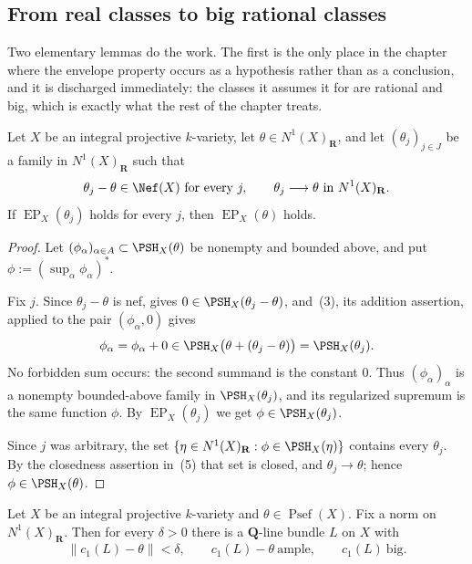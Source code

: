 \subsection{From real classes to big rational classes}
\label{sec:ch40-real-to-rational}

Two elementary lemmas do the work.  The first is the only place in the
chapter where the envelope property occurs as a hypothesis rather than as a
conclusion, and it is discharged immediately: the classes it assumes it for
are rational and big, which is exactly what the rest of the chapter treats.

\begin{lemma}
\label{lem:ch40-ep-nef-limit}
Let $X$ be an integral projective $k$-variety, let
$\theta\in N^1(X)_{\mathbf R}$, and let $(\theta_j)_{j\in J}$ be a family
in $N^1(X)_{\mathbf R}$ such that
\[
 \theta_j-\theta\in\Nef(X)\ \text{for every }j,
 \qquad
 \theta_j\longrightarrow\theta\ \text{in }N^1(X)_{\mathbf R}.
\]
If $\operatorname{EP}_X(\theta_j)$ holds for every $j$, then
$\operatorname{EP}_X(\theta)$ holds.
\end{lemma}

\begin{proof}
Let $(\phi_\alpha)_{\alpha\in A}\subset\PSH_X(\theta)$ be nonempty and
bounded above, and put $\phi:=(\sup_\alpha\phi_\alpha)^*$.

Fix $j$.  Since $\theta_j-\theta$ is nef,
 gives $0\in\PSH_X(\theta_j-\theta)$, and
\,(3), its addition assertion, applied to the pair
$(\phi_\alpha,0)$ gives
\[
 \phi_\alpha=\phi_\alpha+0
 \in\PSH_X\bigl(\theta+(\theta_j-\theta)\bigr)=\PSH_X(\theta_j).
\]
No forbidden sum occurs: the second summand is the constant $0$.  Thus
$(\phi_\alpha)_\alpha$ is a nonempty bounded-above family in
$\PSH_X(\theta_j)$, and its regularized supremum is the same function
$\phi$.  By $\operatorname{EP}_X(\theta_j)$ we get
$\phi\in\PSH_X(\theta_j)$.

Since $j$ was arbitrary, the set
$\{\eta\in N^1(X)_{\mathbf R}:\phi\in\PSH_X(\eta)\}$ contains every
$\theta_j$.  By the closedness assertion in
\,(5) that set is closed, and $\theta_j\to\theta$;
hence $\phi\in\PSH_X(\theta)$.
\end{proof}

\begin{lemma}
\label{lem:ch40-rational-approximation}
Let $X$ be an integral projective $k$-variety and
$\theta\in\operatorname{Psef}(X)$.  Fix a norm on $N^1(X)_{\mathbf R}$.
Then for every $\delta>0$ there is a $\mathbf Q$-line bundle $L$ on
$X$ with
\[
 \lVert c_1(L)-\theta\rVert<\delta,
 \qquad
 c_1(L)-\theta\ \text{ample},
 \qquad
 c_1(L)\ \text{big}.
\]
\end{lemma}

